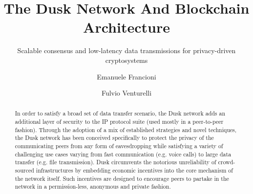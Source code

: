\documentclass[sigconf]{acmart}
\begin{document}
\title{The Dusk Network And Blockchain Architecture}

\subtitle{Scalable consensus and low-latency data transmissions for privacy-driven cryptosystems}

\author{Emanuele Francioni}

\author{Fulvio Venturelli}

\renewcommand{\shortauthors}{E. Francioni and F. Venturelli}

\begin{abstract}
In order to satisfy a broad set of data transfer scenario, the \textrm{Dusk} network adds an additional layer of security to the IP protocol suite (used mostly in a peer-to-peer fashion). Through the adoption of a mix of established strategies and novel techniques, the \textrm{Dusk} network has been conceived specifically to protect the privacy of the communicating peers from any form of eavesdropping while satisfying a variety of challenging use cases varying from fast communication (e.g. voice calls) to large data transfer (e.g. file transmission). \textrm{Dusk} circumvents the notorious unreliability of crowd-sourced infrastructures by embedding economic incentives into the core mechanism of the network itself. Such incentives are designed to encourage peers to partake in the network in a permission-less, anonymous and private fashion.

\end{abstract}


\maketitle








\end{document}
